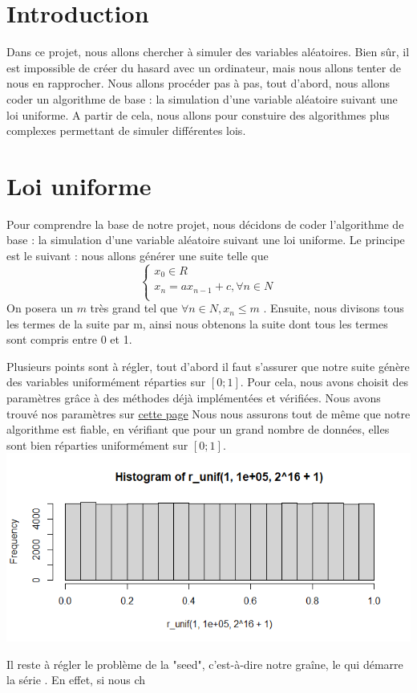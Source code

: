\documentclass{report}
\begin{document}
\section{Introduction}
Dans ce projet, nous allons chercher à simuler des variables aléatoires. Bien sûr, il est impossible de créer du hasard avec un ordinateur, mais nous allons tenter de nous en rapprocher. Nous allons procéder pas à pas, tout d'abord, nous allons coder un algorithme de base : la simulation d'une variable aléatoire suivant une loi uniforme. A partir de cela, nous allons pour constuire des algorithmes plus complexes permettant de simuler différentes lois. 

\section{Loi uniforme}

Pour comprendre la base de notre projet, nous décidons de coder l'algorithme de base : la simulation d'une variable aléatoire suivant une loi uniforme. Le principe est le suivant : nous allons générer une suite 
 telle que 
$$
\left\{
    \begin{array}{ll}
        x_{0} \in R \\
        x_{n} = ax_{n-1} + c,  \forall n \in N \\
    \end{array}
\right.
$$
On posera un $m$ très grand tel que $\forall n \in N, x_{n} \le m$
. Ensuite, nous divisons tous les termes de la suite par m, ainsi nous obtenons la suite 
 dont tous les termes sont compris entre 0 et 1.

Plusieurs points sont à régler, tout d'abord il faut s'assurer que notre suite  génère des variables uniformément réparties sur $[0;1]$. Pour cela, nous avons choisit des paramètres grâce à des méthodes déjà implémentées et vérifiées. Nous avons trouvé nos paramètres sur  
\href{https://en.wikipedia.org/wiki/Linear_congruential_generator}{cette page}
Nous nous assurons tout de même que notre algorithme est fiable, en vérifiant que pour un grand nombre de données, elles sont bien réparties uniformément sur $[0;1].$ 
\includegraphics[scale=0.75]{plot_r_unif.png}

Il reste à régler le problème de la "seed", c'est-à-dire notre graîne, le 
 qui démarre la série 
. En effet, si nous ch
\end{document}

